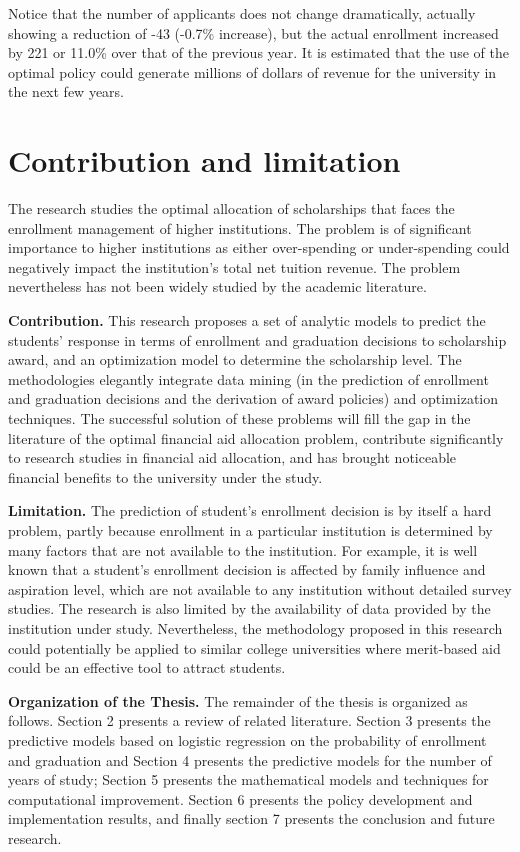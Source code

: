 \documentclass[12pt,english]{report}
\begin{document}
Notice that the number of applicants does not change dramatically, actually showing a reduction of -43 (-0.7\% increase), but the actual enrollment increased by 221  or 11.0\% over that of the previous year.  It is estimated that the use of the optimal policy could generate millions of dollars of revenue for the university in the next few years.

\section{Contribution and limitation}
The research studies the optimal allocation of scholarships that faces the enrollment management of higher institutions.  The problem is of significant importance to higher institutions as either over-spending or under-spending could negatively impact the institution's total net tuition revenue.  The problem nevertheless has not been widely studied by the academic literature.

\textbf{Contribution.} This research proposes a set of analytic models to predict the students' response in terms of enrollment and graduation decisions to scholarship award, and an optimization model to determine the scholarship level.  The methodologies elegantly integrate data mining (in the prediction of enrollment and graduation decisions and the derivation of award policies) and optimization techniques. The successful solution of these problems will fill the gap in the literature of the optimal financial aid allocation problem, contribute significantly to research studies in financial aid allocation, and has brought noticeable financial benefits to the university under the study.

\textbf{Limitation.} The prediction of student's enrollment decision is by itself a hard problem, partly because enrollment in a particular institution is determined by many factors that are not available to the institution.  For example, it is well known that a student's enrollment decision is affected by family influence and aspiration level, which are not available to any institution without detailed survey studies.  The research is also limited by the availability of data provided by the institution under study.   Nevertheless, the methodology proposed in this research could potentially be applied to similar college universities where merit-based aid could be an effective tool to attract students.

\vspace{0.25in}
\noindent \textbf{Organization of the Thesis.} The remainder of the thesis is organized as follows. Section 2 presents a review of related literature. Section 3 presents the predictive models based on logistic regression on the probability of enrollment and graduation and Section 4 presents the predictive models for the number of years of study; Section 5 presents the mathematical models and techniques for computational improvement. Section 6 presents the policy development and implementation results, and finally section 7 presents the conclusion and  future research.
\end{document}
